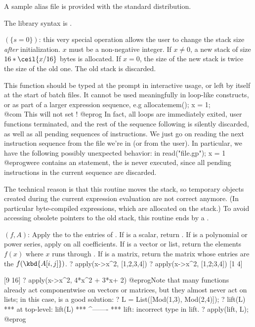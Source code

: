 A sample alias file  is provided with
the standard distribution.

The library syntax is .

$(\{s=0\})$: \label{se:allocatemem}this very special operation
allows the user to change the stack size \emph{after} initialization. $x$
must be a non-negative integer. If $x \neq 0$, a new stack of size
$16*\ceil{x/16}$ bytes is allocated. If $x=0$, the size of
the new stack is twice the size of the old one. The old stack is discarded.

 This function should be typed at the  prompt in
interactive usage, or left by itself at the start of batch files.
It cannot be used meaningfully in loop-like constructs, or as part of a
larger expression sequence, e.g
\bprog
   allocatemem(); x = 1;   \\@com This will not set !
@eprog\noindent
In fact, all loops are immediately exited, user functions terminated, and
the rest of the sequence following  is silently
discarded, as well as all pending sequences of instructions. We just go on
reading the next instruction sequence from the file we're in (or from the
user). In particular, we have the following possibly unexpected behavior: in
\bprog
   read("file.gp"); x = 1
@eprog\noindent were  contains an  statement,
the  is never executed, since all pending instructions in the
current sequence are discarded.

The technical reason is that this routine moves the stack, so temporary
objects created during the current expression evaluation are not correct
anymore. (In particular byte-compiled expressions, which are allocated on
the stack.) To avoid accessing obsolete pointers to the old stack, this
routine ends by a .

$(f, A)$: \label{se:apply}Apply the   to the entries of . If 
is a scalar, return . If  is a polynomial or power series,
apply  on all coefficients. If  is a vector or list, return
the elements $f(x)$ where $x$ runs through . If  is a matrix,
return the matrix whose entries are the $f(\kbd{A[i,j]})$.
\bprog
? apply(x->x^2, [1,2,3,4])
? apply(x->x^2, [1,2;3,4])
[1 4]

[9 16]
? apply(x->x^2, 4*x^2 + 3*x+ 2)
@eprog\noindent Note that many functions already act componentwise on
vectors or matrices, but they almost never act on lists; in this
case,  is a good solution:
\bprog
? L = List([Mod(1,3), Mod(2,4)]);
? lift(L)
  ***   at top-level: lift(L)
  ***                 ^-------
  *** lift: incorrect type in lift.
? apply(lift, L);
@eprog

